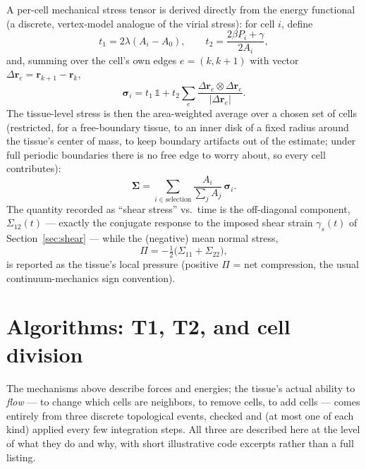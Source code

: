 \documentclass[11pt]{article}
\newcommand{\rvec}{\mathbf{r}}
\begin{document}
A per-cell mechanical stress tensor is derived directly from the energy functional
(a discrete, vertex-model analogue of the virial stress): for cell $i$, define
\begin{equation}
  t_1 = 2\lambda(A_i - A_0), \qquad
  t_2 = \frac{2\beta P_i + \gamma}{2 A_i},
  \label{eq:stress-terms}
\end{equation}
and, summing over the cell's own edges $e=(k,k{+}1)$ with vector
$\Delta\rvec_e = \rvec_{k+1}-\rvec_k$,
\begin{equation}
  \boldsymbol\sigma_i = t_1\, \mathbb{1} + t_2 \sum_{e} \frac{\Delta\rvec_e \otimes \Delta\rvec_e}{|\Delta\rvec_e|}.
  \label{eq:cell-stress}
\end{equation}
The tissue-level stress is then the area-weighted average over a chosen set of cells
(restricted, for a free-boundary tissue, to an inner disk of a fixed radius around the
tissue's center of mass, to keep boundary artifacts out of the estimate; under full
periodic boundaries there is no free edge to worry about, so every cell contributes):
\begin{equation}
  \boldsymbol\Sigma = \sum_{i \in \text{selection}} \frac{A_i}{\sum_j A_j}\, \boldsymbol\sigma_i.
  \label{eq:tissue-stress}
\end{equation}
The quantity recorded as ``shear stress'' vs.\ time is the off-diagonal component,
$\Sigma_{12}(t)$ --- exactly the conjugate response to the imposed shear strain
$\gamma_s(t)$ of Section~\ref{sec:shear} --- while the (negative) mean normal stress,
\begin{equation}
  \Pi = -\tfrac12\big(\Sigma_{11}+\Sigma_{22}\big),
\end{equation}
is reported as the tissue's local pressure (positive $\Pi$ = net compression, the usual
continuum-mechanics sign convention).

\section{Algorithms: T1, T2, and cell division}
\label{sec:algorithms}

The mechanisms above describe forces and energies; the tissue's actual ability to
\emph{flow} --- to change which cells are neighbors, to remove cells, to add cells ---
comes entirely from three discrete topological events, checked and (at most one of
each kind) applied every few integration steps. All three are described here at the
level of what they do and why, with short illustrative code excerpts rather than a
full listing.
\end{document}
